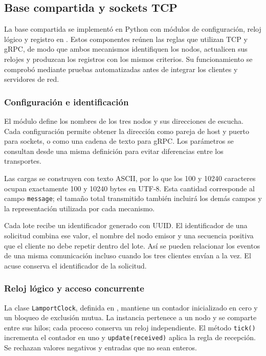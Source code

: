 \subsection{Base compartida y sockets TCP}
\label{sec:base-compartida}

La base compartida se implementó en Python con módulos de configuración, reloj
lógico y registro en . Estos componentes reúnen las reglas que
utilizan TCP y gRPC, de modo que ambos mecanismos identifiquen los nodos,
actualicen sus relojes y produzcan los registros con los mismos criterios.
Su funcionamiento se comprobó mediante pruebas automatizadas antes de integrar
los clientes y servidores de red.

\subsubsection{Configuración e identificación}

El módulo  define los nombres de los tres nodos y sus
direcciones de escucha. Cada configuración permite obtener la dirección como
pareja de host y puerto para sockets, o como una cadena de texto para gRPC.
Los parámetros se consultan desde una misma definición para evitar diferencias
entre los transportes.

Las cargas se construyen con texto ASCII, por lo que los 100 y 10240 caracteres
ocupan exactamente 100 y 10240 bytes en UTF-8. Esta cantidad corresponde al campo
\texttt{message}; el tamaño total transmitido también incluirá los demás campos
y la representación utilizada por cada mecanismo.

Cada lote recibe un identificador generado con UUID. El identificador de una
solicitud combina ese valor, el nombre del nodo emisor y una secuencia positiva
que el cliente no debe repetir dentro del lote. Así se pueden relacionar los
eventos de una misma comunicación incluso cuando los tres clientes envían a la
vez. El acuse conserva el identificador de la solicitud.

\subsubsection{Reloj lógico y acceso concurrente}

La clase \texttt{LamportClock}, definida en , mantiene
un contador inicializado en cero y un bloqueo de exclusión mutua. La instancia
pertenece a un nodo y se comparte entre sus hilos; cada proceso conserva un reloj
independiente. El método \texttt{tick()} incrementa el contador en uno y
\texttt{update(received)} aplica la regla de recepción. Se rechazan valores
negativos y entradas que no sean enteros.

